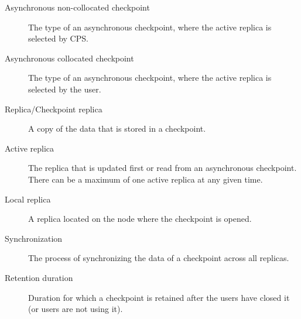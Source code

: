 \begin{flushleft}
\begin{Desc}
\begin{description}
\end{description}
\begin{description}

\item[Asynchronous non-collocated checkpoint] The type of an asynchronous 
            checkpoint, where the active replica is selected by CPS.

\end{description}
\begin{description}

\item[Asynchronous collocated checkpoint] The type of an asynchronous 
            checkpoint, where the active replica is selected by the user.

\end{description}
\begin{description}

\item[Replica/Checkpoint replica] A copy of the data that is stored in a 
            checkpoint.

\end{description}
\begin{description}

\item[Active replica] The replica that is updated first or read from an
            asynchronous checkpoint. There can be a maximum of one active replica at any given time.

\end{description}
\begin{description}

\item[Local replica] A replica located on the node where the checkpoint is opened.

\end{description}
\begin{description}

\item[Synchronization] The process of synchronizing the data of a checkpoint across all replicas.

\end{description}
\begin{description}

\item[Retention duration] Duration for which a checkpoint is retained after the users have closed it (or users are not using it).

\end{description}
\begin{description}


\end{description}
\end{Desc}
\end{flushleft}

